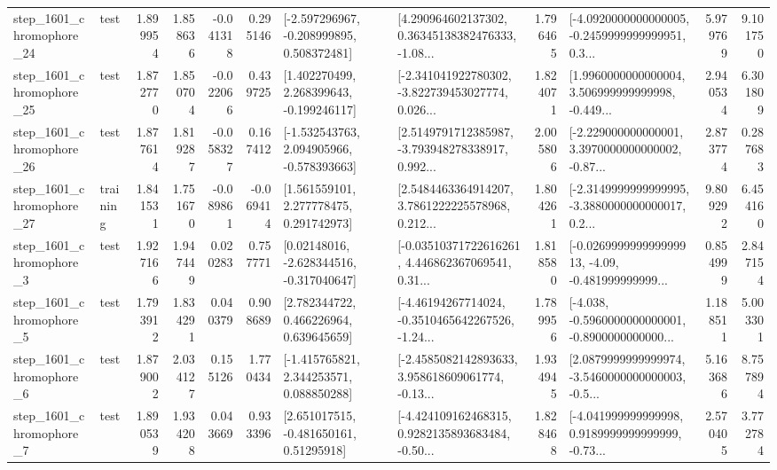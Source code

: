\begin{tabular}{llrrrrllrlrr}
 step\_1601\_chromophore\_24 &      test &      1.899954 &    1.858636 &     -0.041318 &  0.295146 &   [-2.597296967, -0.208999895, 0.508372481] &  [4.290964602137302, 0.36345138382476333, -1.08... &       1.796465 &  [-4.0920000000000005, -0.2459999999999951, 0.3... &            5.979769 &          9.101750 \\
 step\_1601\_chromophore\_25 &      test &      1.872770 &    1.850704 &     -0.022066 &  0.439725 &    [1.402270499, 2.268399643, -0.199246117] &  [-2.341041922780302, -3.822739453027774, 0.026... &       1.824071 &  [1.9960000000000004, 3.506999999999998, -0.449... &            2.940534 &          6.301809 \\
 step\_1601\_chromophore\_26 &      test &      1.877614 &    1.819287 &     -0.058327 &  0.167412 &   [-1.532543763, 2.094905966, -0.578393663] &  [2.5149791712385987, -3.793948278338917, 0.992... &       2.005806 &  [-2.229000000000001, 3.3970000000000002, -0.87... &            2.873774 &          0.287683 \\
 step\_1601\_chromophore\_27 &  training &      1.841531 &    1.751670 &     -0.089861 & -0.069414 &     [1.561559101, 2.277778475, 0.291742973] &  [2.5484463364914207, 3.7861222225578968, 0.212... &       1.804261 &  [-2.3149999999999995, -3.3880000000000017, 0.2... &            9.809292 &          6.454160 \\
  step\_1601\_chromophore\_3 &      test &      1.927166 &    1.947449 &      0.020283 &  0.757771 &    [0.02148016, -2.628344516, -0.317040647] &  [-0.03510371722616261, 4.446862367069541, 0.31... &       1.818580 &  [-0.026999999999999913, -4.09, -0.481999999999... &            0.854999 &          2.847154 \\
  step\_1601\_chromophore\_5 &      test &      1.793912 &    1.834291 &      0.040379 &  0.908689 &     [2.782344722, 0.466226964, 0.639645659] &  [-4.46194267714024, -0.3510465642267526, -1.24... &       1.789956 &  [-4.038, -0.5960000000000001, -0.8900000000000... &            1.188511 &          5.003301 \\
  step\_1601\_chromophore\_6 &      test &      1.879002 &    2.034127 &      0.155126 &  1.770434 &    [-1.415765821, 2.344253571, 0.088850288] &  [-2.4585082142893633, 3.958618609061774, -0.13... &       1.934945 &  [2.0879999999999974, -3.5460000000000003, -0.5... &            5.163686 &          8.757894 \\
  step\_1601\_chromophore\_7 &      test &      1.890539 &    1.934208 &      0.043669 &  0.933396 &     [2.651017515, -0.481650161, 0.51295918] &  [-4.424109162468315, 0.9282135893683484, -0.50... &       1.828468 &  [-4.041999999999998, 0.9189999999999999, -0.73... &            2.570405 &          3.772784 \\

\end{tabular}
